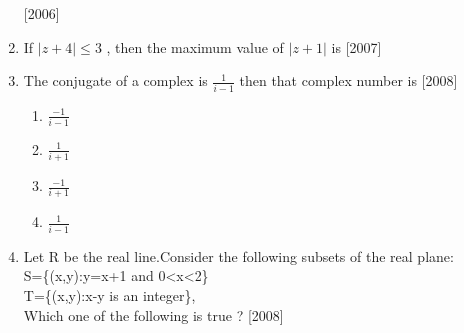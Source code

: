 \documentclass[journal,12pt,twocolumn,article]{IEEEtran}
\theoremstyle{remark}
\begin{document}
\begin{enumerate}[start = 14]
\hfill{[2006]}
\begin{enumerate}
\end{enumerate}
\item If $|z+4|\leq 3$ , then the maximum value of $|z+1|$ is
\hfill{[2007]}                                     
\begin{enumerate}                                  
\end{enumerate}
\item The conjugate of a complex is $\frac{1}{i-1}$ then that complex number is
\hfill{[2008]}
\begin{multicols}{4}
\begin{enumerate}
\item $\frac{-1}{i-1}$
\item $\frac{1}{i+1}$
\item $\frac{-1}{i+1}$
\item $\frac{1}{i-1}$
\end{enumerate}
\end{multicols}
\item Let R be the real line.Consider the following
subsets of the real plane: \\S=\{(x,y):y=x+1 and 0{\textless}x{\textless}2\} \\ T=\{(x,y):x-y is an integer\}, \\Which one of the following is true ?
\hfill{[2008]}
\begin{enumerate}

\end{enumerate}
\end{enumerate}
\end{document}
